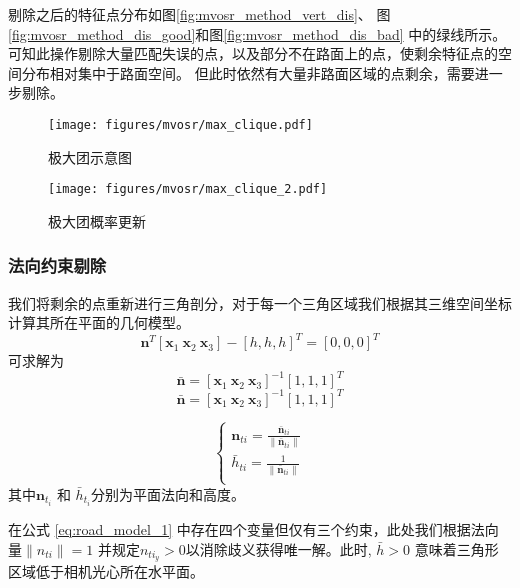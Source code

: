 剔除之后的特征点分布如图\ref{fig:mvosr_method_vert_dis}、
图\ref{fig:mvosr_method_dis_good}和图\ref{fig:mvosr_method_dis_bad}
中的绿线所示。可知此操作剔除大量匹配失误的点，以及部分不在路面上的点，使剩余特征点的空间分布相对集中于路面空间。
但此时依然有大量非路面区域的点剩余，需要进一步剔除。
\begin{figure}
    \texttt{[image: figures/mvosr/max\_clique.pdf]}
    \caption{极大团示意图}
    \label{fig:maximal_clique}
\end{figure}
\begin{figure}
    \texttt{[image: figures/mvosr/max\_clique\_2.pdf]}
    \caption{极大团概率更新}
    \label{fig:maximal_clique_2}
\end{figure}

\subsubsection{法向约束剔除}
\label{sec:mvosr_normcon}
我们将剩余的点重新进行三角剖分，对于每一个三角区域我们根据其三维空间坐标计算其所在平面的几何模型。
\begin{equation}
    \mathbf{n}^T[\mathbf{x}_1\ \mathbf{x}_2\ \mathbf{x}_3] -[h,h,h]^{T}=[0,0,0]^{T}
    \label{eq:road_model_1}
\end{equation}
可求解为 
\begin{equation}
    \mathbf{\bar{n}} = [\mathbf{x}_1\ \mathbf{x}_2\ \mathbf{x}_3]^{-1}[1,1,1]^{T}
    \label{eq:road_model_2}
\end{equation}
\begin{equation}
    \mathbf{\bar{n}} = [\mathbf{x}_1\ \mathbf{x}_2\ \mathbf{x}_3]^{-1}[1,1,1]^{T}
    \label{eq:road_model_2}
\end{equation}

\begin{equation}
    \begin{cases}
        \mathbf{n}_{ti} = \frac{\mathbf{\bar{n}}_{ti}}{\|\mathbf{\bar{n}}_{ti}\|}\\
        \bar{h}_{ti} = \frac{1}{\|\mathbf{\bar{n}}_{ti}\|}\\
    \end{cases}
    \label{eq:road_model_3}
\end{equation}
其中$\mathbf{n}_{t_i}$ 和 $\bar{h}_{t_i}$分别为平面法向和高度。

在公式 \ref{eq:road_model_1} 中存在四个变量但仅有三个约束，此处我们根据法向量$\|n_{ti}\|=1$
并规定$n_{ti_{y}}>0$以消除歧义获得唯一解。此时, $\bar{h}>0$  意味着三角形区域低于相机光心所在水平面。

